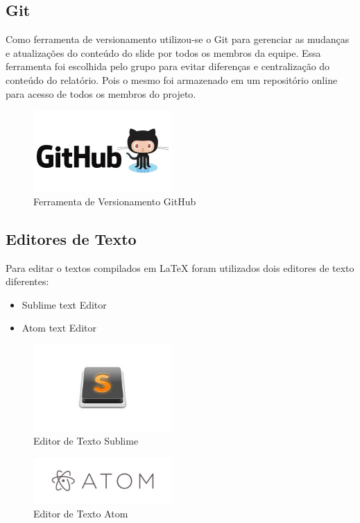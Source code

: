 \subsection{Git}
Como ferramenta de versionamento utilizou-se o Git para gerenciar as mudanças e atualizações do conteúdo do slide
por todos os membros da equipe. Essa ferramenta foi escolhida pelo grupo para evitar diferenças e centralização do
conteúdo do relatório. Pois o mesmo foi armazenado em um repositório online para acesso de todos os membros do projeto.
\begin{figure}[h]
  \centering
  \includegraphics[width=200px, scale=0.5]{figuras/git}
  \caption{Ferramenta de Versionamento GitHub}
  \label{table:git}
\end{figure}
\subsection{Editores de Texto}
\label{sub:Editores de Texto}
Para editar o textos compilados em LaTeX foram utilizados dois editores de texto diferentes:
\begin{itemize}
  \item Sublime text Editor
  \item Atom text Editor
\end{itemize}

\begin{figure}[h]
  \centering
  \includegraphics[width=200px, scale=0.5]{figuras/sublime}
  \caption{Editor de Texto Sublime}
  \label{table:sublime}
\end{figure}
\begin{figure}[h]
  \centering
  \includegraphics[width=200px, scale=0.5]{figuras/atom}
  \caption{Editor de Texto Atom}
  \label{table:atom}
\end{figure}
